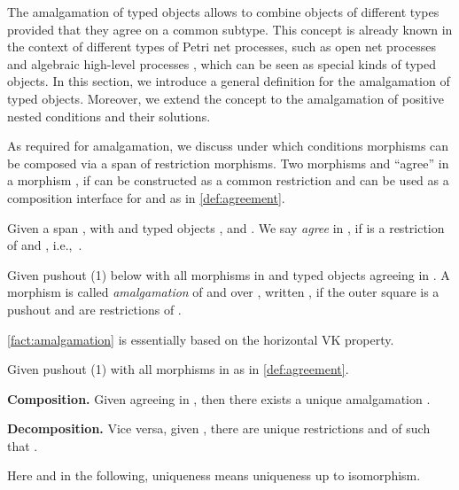 The amalgamation of typed objects allows to combine objects of different types provided that they agree on a common subtype. 
This concept is already known in the context of different types of Petri net processes, such as open net processes \cite{BCEH01}
and algebraic high-level processes \cite{EG11}, which can be seen as special kinds of typed objects. 
In this section, we introduce a general definition for the amalgamation of typed objects. Moreover, we extend the concept to 
the amalgamation of positive nested conditions and their solutions. 

As  required for amalgamation, we discuss under which conditions morphisms can be composed via a span of restriction morphisms. 
Two morphisms  and  ``agree'' in a morphism , if  can be constructed as a common restriction and can be used 
as a composition interface for  and  as in \autoref{def:agreement}.

\begin{definition}\label{def:agreement}
Given a span , 
with  and typed objects ,  and . 
We say  \emph{agree} in , if  is a restriction of  and , i.e.,~.

Given pushout (1) below with all morphisms in \M and typed objects  agreeing in . 
A morphism  is called \emph{amalgamation} of  and  over , written , 
if the outer square is a pushout and  are restrictions of .

\end{definition}




\autoref{fact:amalgamation} is essentially based on the horizontal VK property.

\begin{fact}\label{fact:amalgamation}
Given pushout (1) with all morphisms in \M as in \autoref{def:agreement}.
\begin{description} 
	\item \textbf{Composition.}
		Given  agreeing in , then there exists a unique amalgamation . 
	\item \textbf{Decomposition.}
		Vice versa, given , there are unique restrictions  and  of  such that .
\end{description}
Here and in the following, uniqueness means uniqueness up to isomorphism.
\end{fact}

